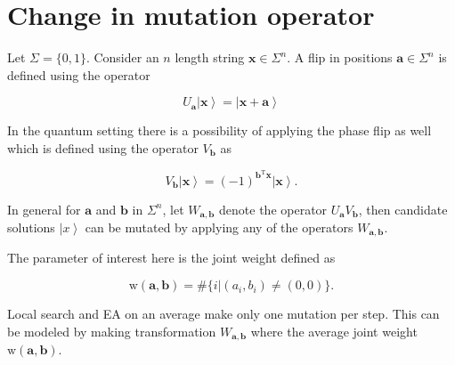 \documentclass{article}
\newcommand{\ket}[1]{\ensuremath{\left\vert #1 \right \rangle}}
\newcommand{\weight}[1]{\ensuremath{\mathrm{w}\left(#1\right)}}
\begin{document}
\section*{Change in mutation operator}

Let $\Sigma=\{0,1\}$. Consider an $n$ length string $\mathbf{x} \in
\Sigma^n$. A flip in positions $\mathbf{a} \in \Sigma^n$ is defined
using the operator 

\[
U_{\mathbf{a}} \ket{\mathbf{x}} = \ket{\mathbf{x} + \mathbf{a}}
\]

In the quantum setting there is a possibility of applying the phase
flip as well which is defined using the operator $V_\mathbf{b}$ as

\[
V_\mathbf{b} \ket{\mathbf{x}} =
(-1)^{\mathbf{b}^{\mathrm{T}}\mathbf{x}} \ket{\mathbf{x}}.
\]

In general for $\mathbf{a}$ and $\mathbf{b}$ in $\Sigma^n$, let
$W_{\mathbf{a},\mathbf{b}}$ denote the operator
$U_\mathbf{a}V_\mathbf{b}$, then candidate solutions $\ket{x}$ can be
mutated by applying any of the operators $W_{\mathbf{a},\mathbf{b}}$.

The parameter of interest here is the joint weight defined as

\[
\weight{\mathbf{a},\mathbf{b}} = \# \{ i | (a_i,b_i) \neq (0,0) \}.
\]

Local search and EA on an average make only one mutation per
step. This can be modeled by making transformation
$W_{\mathbf{a},\mathbf{b}}$ where the average joint weight
$\weight{\mathbf{a},\mathbf{b}}$.
\end{document}
